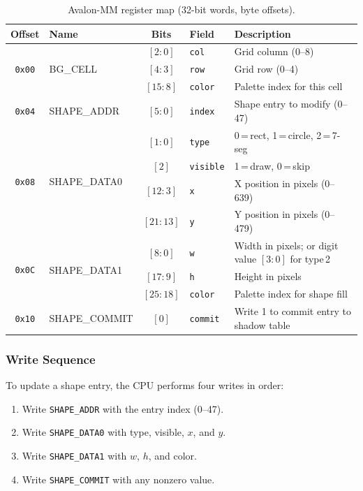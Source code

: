 \documentclass[11pt,letterpaper]{article}
\begin{document}
\begin{table}[H]
\centering
\caption{Avalon-MM register map (32-bit words, byte offsets).}
\label{tab:regmap}
\small
\begin{tabular}{c l c l l}
\toprule
\textbf{Offset} & \textbf{Name} & \textbf{Bits} & \textbf{Field} & \textbf{Description} \\
\midrule
\multirow{3}{*}{\texttt{0x00}}
  & \multirow{3}{*}{BG\_CELL}
  & $[2{:}0]$   & \texttt{col}   & Grid column (0--8) \\
  & & $[4{:}3]$   & \texttt{row}   & Grid row (0--4) \\
  & & $[15{:}8]$  & \texttt{color} & Palette index for this cell \\
\midrule
\texttt{0x04}
  & SHAPE\_ADDR
  & $[5{:}0]$   & \texttt{index} & Shape entry to modify (0--47) \\
\midrule
\multirow{4}{*}{\texttt{0x08}}
  & \multirow{4}{*}{SHAPE\_DATA0}
  & $[1{:}0]$   & \texttt{type}    & 0\,=\,rect, 1\,=\,circle, 2\,=\,7-seg \\
  & & $[2]$       & \texttt{visible} & 1\,=\,draw, 0\,=\,skip \\
  & & $[12{:}3]$  & \texttt{x}       & X position in pixels (0--639) \\
  & & $[21{:}13]$ & \texttt{y}       & Y position in pixels (0--479) \\
\midrule
\multirow{3}{*}{\texttt{0x0C}}
  & \multirow{3}{*}{SHAPE\_DATA1}
  & $[8{:}0]$   & \texttt{w}     & Width in pixels; or digit value $[3{:}0]$ for type\,2 \\
  & & $[17{:}9]$  & \texttt{h}     & Height in pixels \\
  & & $[25{:}18]$ & \texttt{color} & Palette index for shape fill \\
\midrule
\texttt{0x10}
  & SHAPE\_COMMIT
  & $[0]$       & \texttt{commit}& Write 1 to commit entry to shadow table \\
\bottomrule
\end{tabular}
\end{table}

\subsubsection{Write Sequence}

To update a shape entry, the CPU performs four writes in order:

\begin{enumerate}[nosep]
  \item Write \texttt{SHAPE\_ADDR} with the entry index (0--47).
  \item Write \texttt{SHAPE\_DATA0} with type, visible, $x$, and $y$.
  \item Write \texttt{SHAPE\_DATA1} with $w$, $h$, and color.
  \item Write \texttt{SHAPE\_COMMIT} with any nonzero value.
\end{enumerate}
\end{document}
